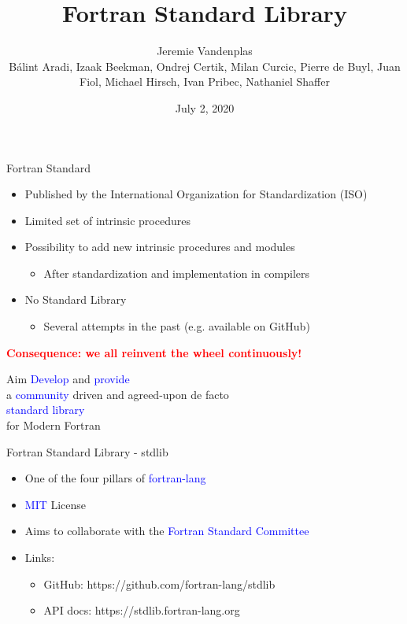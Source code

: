 \documentclass{beamer}
\title{Fortran Standard Library}
\author[]{Jeremie Vandenplas\\[3mm]
Bálint Aradi,
Izaak Beekman,
Ondrej Certik,
Milan Curcic,
Pierre de Buyl,
Juan Fiol,
Michael Hirsch,
Ivan Pribec,
Nathaniel Shaffer}
\date{July 2, 2020}
\begin{document}
\begin{frame}[t]
	\titlepage
\end{frame}	

\begin{frame}[c]{Fortran Standard}
	\begin{itemize}
		\item Published by the International Organization for Standardization (ISO)
		\item Limited set of intrinsic procedures
		\item Possibility to add new intrinsic procedures and modules
		\begin{itemize}
			\item After standardization and implementation in compilers
		\end{itemize}
		\item No Standard Library
		\begin{itemize}
			\item Several attempts in the past (e.g. available on GitHub)
		\end{itemize}
	\end{itemize}
	\center
	\textcolor{red}{\textbf{Consequence: we all reinvent the wheel continuously!}}
\end{frame}


\begin{frame}[c]{Aim}
	\center
	\Large
	\textcolor{blue}{Develop} and \textcolor{blue}{provide}\\
	a \textcolor{blue}{community} driven and agreed-upon de facto\\
	\textcolor{blue}{standard library}\\
	for Modern Fortran
\end{frame}


\begin{frame}[c]{Fortran Standard Library - stdlib}
	\Large
	\begin{itemize}
		\item One of the four pillars of \textcolor{blue}{fortran-lang}
		\item \textcolor{blue}{MIT} License
		\item Aims to \textcolor{mygreen}{collaborate} with the \textcolor{blue}{Fortran Standard Committee}
		\item Links:
		\begin{itemize}
			\item GitHub: https://github.com/fortran-lang/stdlib
			\item API docs: https://stdlib.fortran-lang.org
		\end{itemize}
	\end{itemize}
\end{frame}
\end{document}
